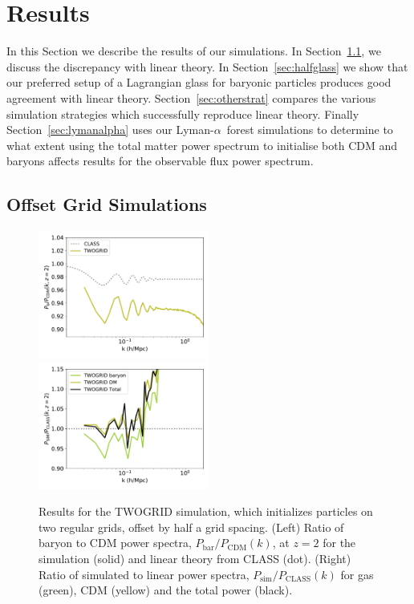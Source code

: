 \documentclass[a4paper,11pt]{article}
\newcommand{\Lya}{Lyman-$\alpha$}
\begin{document}
\section{Results}
\label{sec:results}

In this Section we describe the results of our simulations. In Section~\ref{sec:offsetgrid}, we discuss the discrepancy with linear theory. In Section~\ref{sec:halfglass} we show that our preferred setup of a Lagrangian glass for baryonic particles produces good agreement with linear theory. Section~\ref{sec:otherstrat} compares the various simulation strategies which successfully reproduce linear theory. Finally Section~\ref{sec:lymanalpha} uses our \Lya~forest simulations to determine to what extent using the total matter power spectrum to initialise both CDM and baryons affects results for the observable flux power spectrum.

\subsection{Offset Grid Simulations}
\label{sec:offsetgrid}

\begin{figure}
  \includegraphics[width=0.5\textwidth]{plots/literature_2_relpower.pdf}
\includegraphics[width=0.5\textwidth]{plots/literature_2_class.pdf}
\caption{Results for the TWOGRID simulation, which initializes particles on two regular grids, offset by half a grid spacing. (Left) Ratio of baryon to CDM power spectra, $P_\mathrm{bar}/P_\mathrm{CDM}(k)$, at $z=2$ for the simulation (solid) and linear theory from CLASS (dot). (Right) Ratio of simulated to linear power spectra, $P_\mathrm{sim}/P_\mathrm{CLASS}(k)$ for gas (green), CDM (yellow) and the total power (black).}
  \label{fig:offsetgrids}
\end{figure}
\end{document}
